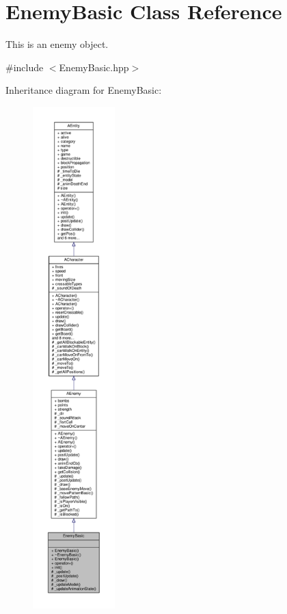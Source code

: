 \hypertarget{class_enemy_basic}{}\section{Enemy\+Basic Class Reference}
\label{class_enemy_basic}


This is an enemy object.  




{\ttfamily \#include $<$Enemy\+Basic.\+hpp$>$}



Inheritance diagram for Enemy\+Basic\+:
\nopagebreak
\begin{figure}[H]
\begin{center}
\leavevmode
\includegraphics[height=550pt]{class_enemy_basic__inherit__graph}
\end{center}
\end{figure}


